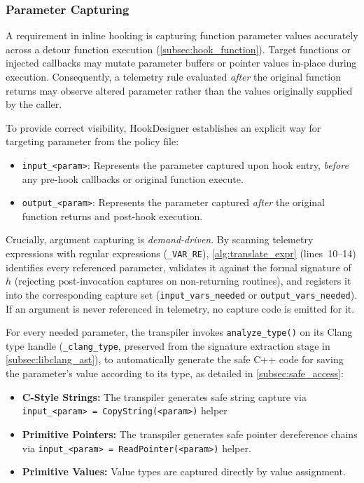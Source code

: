 \subsubsection{Parameter Capturing}
\label{subsec:param_capture}

A requirement in inline hooking is capturing function parameter values accurately across a detour function execution (\cref{subsec:hook_function}).
Target functions or injected callbacks may mutate parameter buffers or pointer values in-place during execution.
Consequently, a telemetry rule evaluated \emph{after} the original function returns may observe altered parameter rather than the values originally supplied by the caller.

To provide correct visibility, HookDesigner establishes an explicit way for targeting parameter from the policy file:
\begin{itemize}
	\item \texttt{input\_<param>}: Represents the parameter captured upon hook entry, \emph{before} any pre-hook callbacks or original function execute.
	\item \texttt{output\_<param>}: Represents the parameter captured \emph{after} the original function returns and post-hook execution.
\end{itemize}

Crucially, argument capturing is \emph{demand-driven}.
By scanning telemetry expressions with regular expressions (\texttt{\_VAR\_RE}), \cref{alg:translate_expr} (lines~10--14) identifies every referenced parameter, validates it against the formal signature of $h$ (rejecting post-invocation captures on non-returning routines), and registers it into the corresponding capture set (\texttt{input\_vars\_needed} or \texttt{output\_vars\_needed}).
If an argument is never referenced in telemetry, no capture code is emitted for it.

For every needed parameter, the transpiler invokes \texttt{analyze\_type()} on its Clang type handle (\texttt{\_clang\_type}, preserved from the signature extraction stage in \cref{subsec:libclang_ast}), to automatically generate the safe C++ code for saving the parameter's value according to its type, as detailed in \cref{subsec:safe_access}:
\begin{itemize}
	\item \textbf{C-Style Strings:} The transpiler generates safe string capture via \texttt{input\_<param> = CopyString(<param>)} helper
	\item \textbf{Primitive Pointers:} The transpiler generates safe pointer dereference chains via \texttt{input\_<param> = ReadPointer(<param>)} helper.
	\item \textbf{Primitive Values:} Value types are captured directly by value assignment.
\end{itemize}

